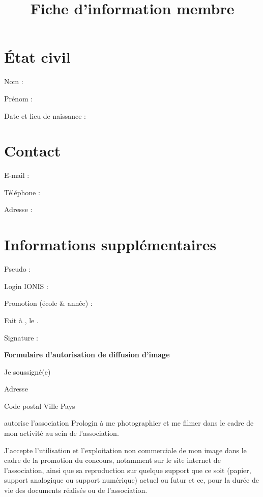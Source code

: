 \documentclass[a4paper,12pt]{prologin}
\title{Fiche d'information membre}
\begin{document}
\section*{État civil}

Nom : \hrulefill

Prénom : \hrulefill

Date et lieu de naissance : \hrulefill

\section*{Contact}

E-mail : \hrulefill

Téléphone : \hrulefill

Adresse : \hrulefill

\hrulefill

\section*{Informations supplémentaires}
Pseudo : \hrulefill

Login IONIS : \hrulefill

Promotion (école \& année) : \hrulefill

\vspace{2cm}

Fait à \hrulefill, le \hrulefill.

Signature :

\newpage

\begin{Large}
    \begin{center}
        \textbf{Formulaire d'autorisation de diffusion d'image}
    \end{center}
\end{Large}

Je soussigné(e) \hrulefill

Adresse \hrulefill

Code postal \hrulefill{} Ville \hrulefill\hrulefill\hrulefill{} Pays \hrulefill

autorise l'association Prologin à me photographier et me filmer dans
le cadre de mon activité au sein de l'association.

J'accepte l'utilisation et l'exploitation non commerciale de mon
image dans le cadre de la promotion du concours, notamment sur le site internet
de l'association, ainsi que sa reproduction sur quelque support que ce soit
(papier, support analogique ou support numérique) actuel ou futur et ce, pour la
durée de vie des documents réalisés ou de l'association.
\end{document}
